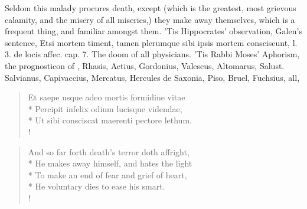 Seldom this malady procures death, except (which is the greatest,
most grievous calamity, and the misery of all miseries,) they make away
themselves, which is a frequent thing, and familiar amongst them. 'Tis
Hippocrates' observation, Galen's sentence, Etsi mortem timent,
tamen plerumque sibi ipsis mortem consciscunt, l. 3. de locis affec.
cap. 7. The doom of all physicians. 'Tis Rabbi Moses' Aphorism,
the prognosticon of \Avicenna{}, Rhasis, Aetius, Gordonius, Valescus,
Altomarus, Salust. Salvianus, Capivaccius, Mercatus, Hercules de
Saxonia, Piso, Bruel, Fuchsius, all, \etc{}

\begin{latin}
\begin{verse}%
Et saepe usque adeo mortis formidine vitae\\*
Percipit infelix odium lucisque videndae,\\*
Ut sibi consciscat maerenti pectore lethum.\\!
\end{verse}%
\end{latin}
\translationrule%
\begin{verse}%
And so far forth death's terror doth affright,\\*
He makes away himself, and hates the light\\*
To make an end of fear and grief of heart,\\*
He voluntary dies to ease his smart.\\!
\end{verse}%
%

